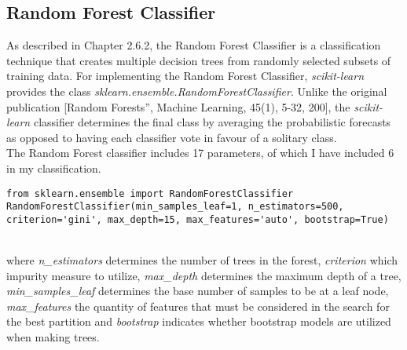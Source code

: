 \documentclass[a4paper, 11pt,titlepage,oneside,openany]{book}
\begin{document}
\subsection{Random Forest Classifier}
As described in Chapter 2.6.2, the Random Forest Classifier is a classification technique that creates multiple decision trees from randomly selected subsets of training data. For implementing the Random Forest Classifier, \textit{scikit-learn} provides the class \textit{sklearn.ensemble.RandomForestClassifier}. Unlike the original publication [Random Forests”, Machine Learning, 45(1), 5-32, 200], the \textit{scikit-learn} classifier determines the final class by averaging the probabilistic forecasts as opposed to having each classifier vote in favour of a solitary class. \\
\noindent The Random Forest classifier includes 17 parameters, of which I have included 6 in my classification.\\
\noindent
\begin{minipage}{\linewidth}
	\begin{lstlisting}
from sklearn.ensemble import RandomForestClassifier
RandomForestClassifier(min_samples_leaf=1, n_estimators=500, criterion='gini', max_depth=15, max_features='auto', bootstrap=True)
	\end{lstlisting}
\end{minipage} \\
where \textit{n\_estimators} determines the number of trees in the forest, \textit{criterion} which impurity measure to utilize, \textit{max\_depth} determines the maximum depth of a tree, \textit{min\_samples\_leaf} determines the base number of samples to be at a leaf node, \textit{max\_features} the quantity of features that must be considered in the search for the best partition and \textit{bootstrap} indicates whether bootstrap models are utilized when making trees.
\end{document}
